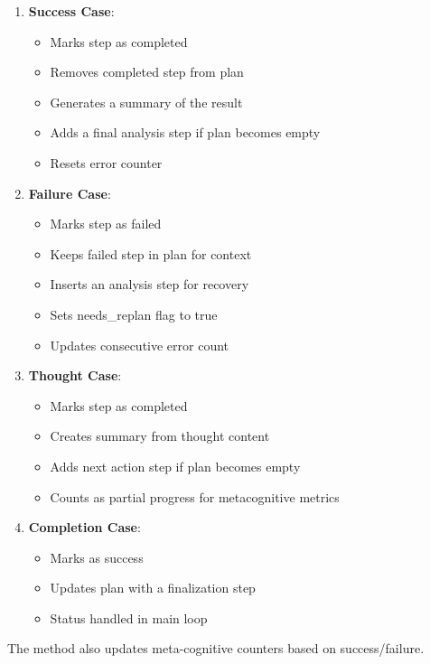 \documentclass[12pt,a4paper]{article}
\begin{document}
\begin{enumerate}[label=\arabic*.]
    \item \textbf{Success Case}:
    \begin{itemize}
        \item Marks step as completed
        \item Removes completed step from plan
        \item Generates a summary of the result
        \item Adds a final analysis step if plan becomes empty
        \item Resets error counter
    \end{itemize}

    \item \textbf{Failure Case}:
    \begin{itemize}
        \item Marks step as failed
        \item Keeps failed step in plan for context
        \item Inserts an analysis step for recovery
        \item Sets needs\_replan flag to true
        \item Updates consecutive error count
    \end{itemize}

    \item \textbf{Thought Case}:
    \begin{itemize}
        \item Marks step as completed
        \item Creates summary from thought content
        \item Adds next action step if plan becomes empty
        \item Counts as partial progress for metacognitive metrics
    \end{itemize}

    \item \textbf{Completion Case}:
    \begin{itemize}
        \item Marks as success
        \item Updates plan with a finalization step
        \item Status handled in main loop
    \end{itemize}
\end{enumerate}

The method also updates meta-cognitive counters based on success/failure.
\end{document}

